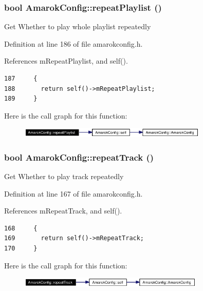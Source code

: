 \subsubsection{\setlength{\rightskip}{0pt plus 5cm}bool Amarok\-Config::repeat\-Playlist ()\hspace{0.3cm}{\tt  [inline, static]}}\label{classAmarokConfig_AmarokConfige18}


Get Whether to play whole playlist repeatedly 

Definition at line 186 of file amarokconfig.h.

References m\-Repeat\-Playlist, and self().



\footnotesize\begin{verbatim}187     {
188       return self()->mRepeatPlaylist;
189     }
\end{verbatim}\normalsize 


Here is the call graph for this function:\begin{figure}[H]
\begin{center}
\leavevmode
\includegraphics[width=254pt]{classAmarokConfig_AmarokConfige18_cgraph}
\end{center}
\end{figure}
\subsubsection{\setlength{\rightskip}{0pt plus 5cm}bool Amarok\-Config::repeat\-Track ()\hspace{0.3cm}{\tt  [inline, static]}}\label{classAmarokConfig_AmarokConfige16}


Get Whether to play track repeatedly 

Definition at line 167 of file amarokconfig.h.

References m\-Repeat\-Track, and self().



\footnotesize\begin{verbatim}168     {
169       return self()->mRepeatTrack;
170     }
\end{verbatim}\normalsize 


Here is the call graph for this function:\begin{figure}[H]
\begin{center}
\leavevmode
\includegraphics[width=250pt]{classAmarokConfig_AmarokConfige16_cgraph}
\end{center}
\end{figure}
